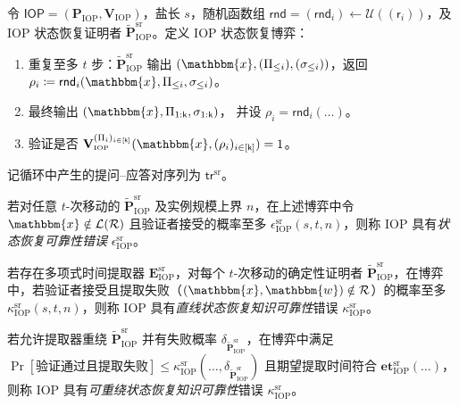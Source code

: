 \documentclass[american,singlepageview]{snargs-book-zh}
\newcommand{\Malicious}[1]{\tilde{#1}}
\newcommand{\DefineEqual}{\coloneqq}
\newcommand{\Relation}{\mathcal{R}}
\newcommand{\Language}{\mathcal{L}}
\newcommand{\GetLanguage}[1]{\Language(#1)}
\newcommand{\Instance}{\mathbbm{x}}
\newcommand{\Witness}{\mathbbm{w}}
\newcommand{\InstanceSize}{n}
\newcommand{\ProtoProver}{P}
\newcommand{\ProtoVerifier}{V}
\newcommand{\ProtoExtractor}{E}
\newcommand{\ProtoSoundnessError}{\epsilon}
\newcommand{\ProtoKnowledgeError}{\kappa}
\newcommand{\ProtoKnowledgeTime}{\mathbf{et}}
\newcommand{\ProtoRoundComplexity}{\mathsf{k}}
\newcommand{\ProtoRandomnessComplexity}{\mathsf{r}}
\newcommand{\RoundIndex}{i}
\newcommand{\SRSuperscript}{\mathrm{sr}}
\newcommand{\ProtoSRSoundnessError}{\ProtoSoundnessError^{\SRSuperscript}}
\newcommand{\ProtoSRKnowledgeError}{\ProtoKnowledgeError^{\SRSuperscript}}
\newcommand{\IOPSymbol}{\mathsf{IOP}}
\newcommand{\IOPSubscript}{\scriptscriptstyle\mathrm{IOP}}
\newcommand{\IOPFormat}[1]{\mathbf{#1}}
\newcommand{\IOPProver}{\IOPFormat{\ProtoProver}_{\IOPSubscript}}
\newcommand{\IOPVerifier}{\IOPFormat{\ProtoVerifier}_{\IOPSubscript}}
\newcommand{\IOPExtractor}{\IOPFormat{\ProtoExtractor}_{\IOPSubscript}}
\newcommand{\IOPMaliciousProver}{\Malicious{\IOPFormat{\ProtoProver}}_{\IOPSubscript}}
\newcommand{\IOPSystem}{(\IOPProver,\IOPVerifier)}
\newcommand{\IOPString}{\Pi}
\newcommand{\IOPVerifierRandomMessage}{\rho}
\newcommand{\IOPRoundComplexity}{\ProtoRoundComplexity}
\newcommand{\IOPRandomnessComplexity}{\ProtoRandomnessComplexity}
\newcommand{\IOPStrings}{(\IOPString_{\RoundIndex})_{\RoundIndex \in [\IOPRoundComplexity]}}
\newcommand{\IOPVerifierRandomMessages}{(\IOPVerifierRandomMessage_{\RoundIndex})_{\RoundIndex \in [\IOPRoundComplexity]}}
\newcommand{\ProverFailureProbability}[1]{\delta_{#1}}
\newcommand{\RODistribution}[1]{\mathcal{U}(#1)}
\newcommand{\ROTrace}{\mathsf{tr}}
\newcommand{\SRBudget}{t}
\newcommand{\SRSaltSize}{s}
\newcommand{\SRSaltString}{\sigma}
\newcommand{\SRRandomness}{\mathsf{rnd}}
\newcommand{\SRTrace}{\ROTrace^{\SRSuperscript}}
\newcommand{\IOPSRSoundnessError}{\ProtoSRSoundnessError_{\IOPSubscript}}
\newcommand{\IOPSRKnowledgeError}{\ProtoSRKnowledgeError_{\IOPSubscript}}
\newcommand{\IOPSRKnowledgeTime}{\ProtoKnowledgeTime_{\IOPSubscript}^{\SRSuperscript}}
\newcommand{\IOPSRExtractor}{\IOPExtractor^{\SRSuperscript}}
\newcommand{\IOPMaliciousSRProver}{\IOPMaliciousProver^{\SRSuperscript}}
\begin{document}
\begin{definition}
\label{definition:iop-state-restoration-game}
令 $\IOPSymbol=\IOPSystem$，盐长 $\SRSaltSize$，随机函数组 $\SRRandomness=(\SRRandomness_{\RoundIndex})\gets\RODistribution{(\IOPRandomnessComplexity_{\RoundIndex})}$，及 IOP 状态恢复证明者 $\IOPMaliciousSRProver$。定义 IOP 状态恢复博弈：
\begin{enumerate}[noitemsep]
  \item 重复至多 $\SRBudget$ 步：$\IOPMaliciousSRProver$ 输出 $(\Instance,(\IOPString_{\le i}),(\SRSaltString_{\le i}))$，返回
    \(\IOPVerifierRandomMessage_{i}\DefineEqual\SRRandomness_{i}(\Instance,\IOPString_{\le i},\SRSaltString_{\le i})\)。
  \item 最终输出 $(\Instance,\IOPString_{1:\IOPRoundComplexity},\SRSaltString_{1:\IOPRoundComplexity})$，
    并设 $\IOPVerifierRandomMessage_{i}=\SRRandomness_{i}(\dots)$。
  \item 验证是否 $\IOPVerifier^{\IOPStrings}(\Instance,\IOPVerifierRandomMessages)=1$。
\end{enumerate}
记循环中产生的提问–应答对序列为 $\SRTrace$。
\end{definition}

\begin{definition}
\label{definition:iop-state-restoration-soundness}
若对任意 $\SRBudget$-次移动的 $\IOPMaliciousSRProver$ 及实例规模上界 $\InstanceSize$，在上述博弈中令
$\Instance\notin\GetLanguage{\Relation}$ 且验证者接受的概率至多
$\IOPSRSoundnessError(\SRSaltSize,\SRBudget,\InstanceSize)$，则称 IOP 具有\emph{状态恢复可靠性错误} $\IOPSRSoundnessError$。
\end{definition}

\begin{definition}
\label{definition:iop-state-restoration-knowledge-straightline}
若存在多项式时间提取器 $\IOPSRExtractor$，对每个 $\SRBudget$-次移动的确定性证明者 $\IOPMaliciousSRProver$，在博弈中，若验证者接受且提取失败（$(\Instance,\Witness)\notin\Relation$）的概率至多
$\IOPSRKnowledgeError(\SRSaltSize,\SRBudget,\InstanceSize)$，则称 IOP 具有\emph{直线状态恢复知识可靠性}错误 $\IOPSRKnowledgeError$。
\end{definition}

\begin{definition}
\label{definition:iop-state-restoration-knowledge}
若允许提取器重绕 $\IOPMaliciousSRProver$ 并有失败概率 $\ProverFailureProbability{\IOPMaliciousSRProver}$，在博弈中满足
\(\Pr[\text{验证通过且提取失败}]\le\IOPSRKnowledgeError(\dots,\ProverFailureProbability{\IOPMaliciousSRProver})\)
且期望提取时间符合 $\IOPSRKnowledgeTime(\dots)$，则称 IOP 具有\emph{可重绕状态恢复知识可靠性}错误 $\IOPSRKnowledgeError$。
\end{definition}
\end{document}
